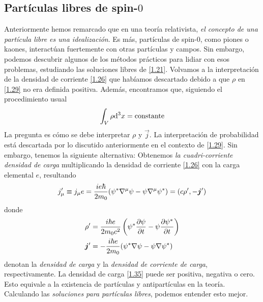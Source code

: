 \subsection{Partículas libres de spin-$0$}
Anteriormente hemos remarcado que en una teoría relativista,\textit{ el concepto de una partícula libre es una idealización}. Es más, partículas de spin-$0$, como piones o kaones, interactúan fuertemente con otras partículas y campos. Sin embargo, podemos descubrir algunos de los métodos prácticos para lidiar con esos problemas, estudiando las soluciones libres de \eqref{1.21}. Volvamos a la interpretación de la densidad de corriente \eqref{1.26} que habíamos descartado debido a que $\rho$ en \eqref{1.29} no era definida positiva. Además, encontramos que, siguiendo el procedimiento usual
\begin{equation}
  \int_V\rho\dd^3x=\rm constante
\end{equation}
La pregunta es cómo se debe interpretar $\rho$ y $\vec{j}$. La interpretación de probabilidad está descartada por lo discutido anteriormente en el contexto de \eqref{1.29}. Sin embargo, tenemos la siguiente alternativa: Obtenemos \textit{la cuadri-corriente densidad de carga} multiplicando la densidad de corriente \eqref{1.26} con la carga elemental $e$, resultando
\begin{align}
  j_\mu '\equiv j_\mu e=\frac{i e\hbar}{2m_0}(\psi^*\nabla^\mu \psi-\psi\nabla^\mu \psi^*)=(c\rho',-\vb*{j}')
\end{align}
donde
\begin{align}
 \label{1.35} \rho'&=\frac{i\hbar e}{2m_0c^2}\left(\psi^*\pdv{\psi}{t}-\psi\pdv{\psi^*}{t}\right)\\
  \vb*{j}'&=-\frac{i\hbar e}{2m_0}(\psi^*\nabla \psi-\psi\nabla\psi^*)\label{1.36}
\end{align}
denotan la \textit{densidad de carga} y la \textit{densidad de corriente de carga}, respectivamente. La densidad de carga \eqref{1.35} puede ser positiva, negativa o cero. Esto equivale a la existencia de partículas y antipartículas en la teoría. Calculando las \textit{soluciones para partículas libres}, podemos entender esto mejor.























































